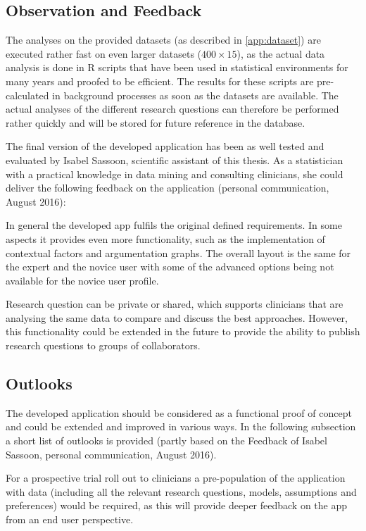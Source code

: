 \subsection{Observation and Feedback}
\sloppy

The analyses on the provided datasets (as described in \autoref{app:dataset}) are executed rather fast on even larger datasets ($400 \times 15$), as the actual data analysis is done in  \gls{R} scripts that have been used in statistical environments for many years and proofed to be efficient. The results for these scripts are pre-calculated in background processes as soon as the datasets are available. The actual analyses of the different research questions can therefore be performed rather quickly and will be stored for future reference in the database.

The final version of the developed application has been as well tested and evaluated by Isabel Sassoon, scientific assistant of this thesis. As a statistician with a practical knowledge in data mining and consulting clinicians, she could deliver the following feedback on the application (personal communication, August 2016):

In general the developed app fulfils the original defined requirements. In some aspects it provides even more functionality, such as the implementation of contextual factors and argumentation graphs. The overall layout is the same for the expert and the novice user with some of the advanced options being not available for the novice user profile.

Research question can be private or shared, which supports clinicians that are analysing the same data to compare and discuss the best approaches. However, this functionality could be extended in the future to provide the ability to publish research questions to groups of collaborators.


\subsection{Outlooks}
\label{sub:outlooks}

The developed application should be considered as a functional proof of concept and could be extended and improved in various ways. In the following subsection a short list of outlooks is provided (partly based on the Feedback of Isabel Sassoon, personal communication, August 2016).

For a prospective trial roll out to clinicians a pre-population of the application with data (including  all the relevant research questions, models, assumptions and preferences) would be required, as this will provide deeper feedback on the app from an end user perspective.

